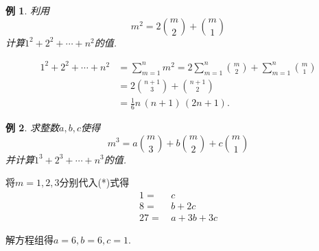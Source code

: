 \documentclass[10pt,punct]{ctexbeamer}
\newtheorem{ex}{例}
\begin{document}



\begin{frame}
\begin{ex}
    利用\[m^{2}=2\binom{m}{2}+\binom{m}{1} \]	计算$1^{2}+2^{2}+\cdots+n^{2}$的值.
\end{ex}
\pause
\[
\begin{aligned}
    1^{2}+2^{2}+\cdots+n^{2}
    &=\sum_{m=1}^{n}m^{2}
    =2\sum_{m=1}^{n}\binom{m}{2}+\sum_{m=1}^{n}\binom{m}{1}\\
    &=2\binom{n+1}{3}+\binom{n+1}{2}\\
    &=\frac{1}{6}n\, (n+1)\, (2n+1).
\end{aligned}
\]
\end{frame}


\begin{frame}
\begin{ex}
    求整数$a,b,c$使得\[m^{3}=a\binom{m}{3}+b\binom{m}{2}+c\binom{m}{1}\tag{*}\]并计算$1^{3}+2^{3}+\cdots+n^{3}$的值.
\end{ex}
\pause
将$m=1,2,3$分别代入(*)式得
\begin{align*}
    1 = &\,  c \\
    8 = &\,  b+2 c \\
    27 = &\,   a+3 b+3 c
\end{align*}

解方程组得$a=6,b=6,c=1$.

\end{frame}
\end{document}
